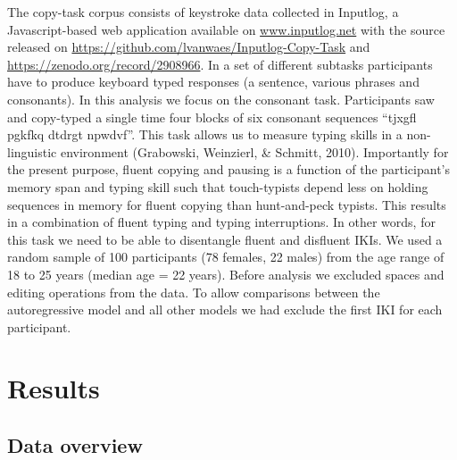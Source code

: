 \documentclass[english,man,floatsintext]{apa7}
\begin{document}
The copy-task corpus consists of keystroke data collected in Inputlog, a Javascript-based web application available on \url{www.inputlog.net} with the source released on \url{https://github.com/lvanwaes/Inputlog-Copy-Task} and \url{https://zenodo.org/record/2908966}. In a set of different subtasks participants have to produce keyboard typed responses (a sentence, various phrases and consonants). In this analysis we focus on the consonant task. Participants saw and copy-typed a single time four blocks of six consonant sequences \enquote{tjxgfl pgkfkq dtdrgt npwdvf}. This task allows us to measure typing skills in a non-linguistic environment (Grabowski, Weinzierl, \& Schmitt, 2010). Importantly for the present purpose, fluent copying and pausing is a function of the participant's memory span and typing skill such that touch-typists depend less on holding sequences in memory for fluent copying than hunt-and-peck typists. This results in a combination of fluent typing and typing interruptions. In other words, for this task we need to be able to disentangle fluent and disfluent IKIs. We used a random sample of 100 participants (78 females, 22 males) from the age range of 18 to 25 years (median age = 22 years). Before analysis we excluded spaces and editing operations from the data. To allow comparisons between the autoregressive model and all other models we had exclude the first IKI for each participant.

\hypertarget{results}{%
\section{Results}\label{results}}

\hypertarget{data-overview}{%
\subsection{Data overview}\label{data-overview}}
\end{document}
